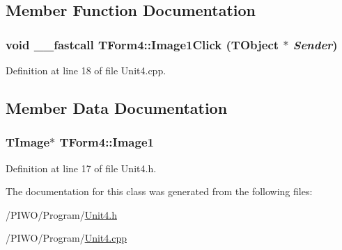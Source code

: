 \subsection{Member Function Documentation}
\hypertarget{classTForm4_940bfe645e8bfa4b957cb07f027c0761}{
\subsubsection[Image1Click]{\setlength{\rightskip}{0pt plus 5cm}void \_\-\_\-fastcall TForm4::Image1Click (TObject $\ast$ {\em Sender})}}
\label{classTForm4_940bfe645e8bfa4b957cb07f027c0761}




Definition at line 18 of file Unit4.cpp.

\subsection{Member Data Documentation}
\hypertarget{classTForm4_af7ff6a81c3378b0c7245d55372576df}{
\subsubsection[Image1]{\setlength{\rightskip}{0pt plus 5cm}TImage$\ast$ {\bf TForm4::Image1}}}
\label{classTForm4_af7ff6a81c3378b0c7245d55372576df}




Definition at line 17 of file Unit4.h.

The documentation for this class was generated from the following files:\begin{CompactItemize}
\item 
/PIWO/Program/\hyperlink{Unit4_8h}{Unit4.h}\item 
/PIWO/Program/\hyperlink{Unit4_8cpp}{Unit4.cpp}\end{CompactItemize}
